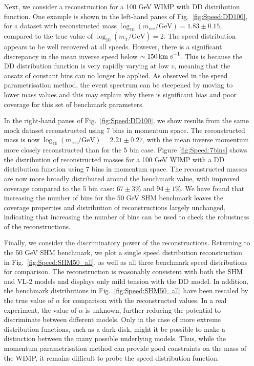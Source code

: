 Next, we consider a reconstruction for a 100 GeV WIMP with DD distribution function. One example is shown in the left-hand panes of Fig.\ \ref{fig:Speed:DD100}, for a dataset with reconstructed mass \(\log_{10}(m_\textrm{rec} / \textrm{GeV}) = 1.83 \pm 0.15\), compared to the true value of \(\log_{10}(m_\chi / \textrm{GeV}) = 2\). The speed distribution appears to be well recovered at all speeds. However, there is a significant discrepancy in the mean inverse speed below \(\sim 150 \,\textrm{km s}^{-1}\). This is because the DD distribution function is very rapidly varying at low \(v\), meaning that the ansatz of constant bins can no longer be applied. As observed in the speed parametrisation method, the event spectrum can be steepened by moving to lower mass values and this may explain why there is significant bias and poor coverage for this set of benchmark parameters.

In the right-hand panes of Fig.\ \ref{fig:Speed:DD100}, we show results from the same mock dataset reconstructed using 7 bins in momentum space. The reconstructed mass is now \(\log_{10}(m_\textrm{rec} / \textrm{GeV}) = 2.21 \pm 0.27\), with the mean inverse momentum more closely reconstructed than for the 5 bin case. Figure \ref{fig:Speed:7bins} shows the distribution of reconstructed masses for a 100 GeV WIMP with a DD distribution function using 7 bins in momentum space. The reconstructed masses are now more broadly distributed around the benchmark value, with improved coverage compared to the 5 bin case: \(67 \pm 3 \%\) and \(94 \pm 1 \%\). We have found that increasing the number of bins for the 50 GeV SHM benchmark leaves the coverage properties and distribution of reconstructions largely unchanged, indicating that increasing the number of bins can be used to check the robustness of the reconstructions.


Finally, we consider the discriminatory power of the reconstructions. Returning to the 50 GeV SHM benchmark, we plot a single speed distribution reconstruction in Fig.\ \ref{fig:Speed:SHM50_all}, as well as all three benchmark speed distributions for comparison. The reconstruction is reasonably consistent with both the SHM and VL-2 models and displays only mild tension with the DD model. In addition, the benchmark distributions in Fig.\ \ref{fig:Speed:SHM50_all} have been rescaled by the true value of \(\alpha\) for comparison with the reconstructed values. In a real experiment, the value of \(\alpha\) is unknown, further reducing the potential to discriminate between different models. Only in the case of more extreme distribution functions, such as a dark disk, might it be possible to make a distinction between the many possible underlying models. Thus, while the momentum parametrisation method can provide good constraints on the mass of the WIMP, it remains difficult to probe the speed distribution function.

